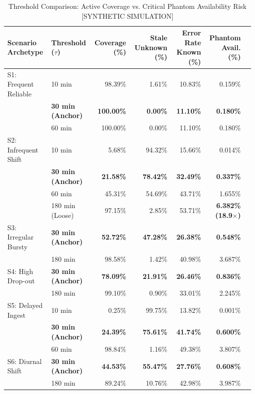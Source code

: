\documentclass[conference]{IEEEtran}
\begin{document}
\begin{table}[t]
\caption{Threshold Comparison: Active Coverage vs. Critical Phantom Availability Risk [SYNTHETIC SIMULATION]}
\label{tab:threshold_comparison}
\centering
\begin{tabular}{llrrrrr}
\toprule
Scenario Archetype & Threshold ($\tau$) & Coverage (\%) & Stale Unknown (\%) & Error Rate Known (\%) & Phantom Avail. (\%) \\
\midrule
S1: Frequent Reliable & 10 min & 98.39\% & 1.61\% & 10.83\% & 0.159\% \\
                      & \textbf{30 min (Anchor)} & \textbf{100.00\%} & \textbf{0.00\%} & \textbf{11.10\%} & \textbf{0.180\%} \\
                      & 60 min & 100.00\% & 0.00\% & 11.10\% & 0.180\% \\
\midrule
S2: Infrequent Shift  & 10 min & 5.68\% & 94.32\% & 15.66\% & 0.014\% \\
                      & \textbf{30 min (Anchor)} & \textbf{21.58\%} & \textbf{78.42\%} & \textbf{32.49\%} & \textbf{0.337\%} \\
                      & 60 min & 45.31\% & 54.69\% & 43.71\% & 1.655\% \\
                      & 180 min (Loose) & 97.15\% & 2.85\% & 53.71\% & \textbf{6.382\% (18.9$\times$)} \\
\midrule
S3: Irregular Bursty  & \textbf{30 min (Anchor)} & \textbf{52.72\%} & \textbf{47.28\%} & \textbf{26.38\%} & \textbf{0.548\%} \\
                      & 180 min & 98.58\% & 1.42\% & 40.98\% & 3.687\% \\
\midrule
S4: High Drop-out     & \textbf{30 min (Anchor)} & \textbf{78.09\%} & \textbf{21.91\%} & \textbf{26.46\%} & \textbf{0.836\%} \\
                      & 180 min & 99.10\% & 0.90\% & 33.01\% & 2.245\% \\
\midrule
S5: Delayed Ingest    & 10 min & 0.25\% & 99.75\% & 13.82\% & 0.001\% \\
                      & \textbf{30 min (Anchor)} & \textbf{24.39\%} & \textbf{75.61\%} & \textbf{41.74\%} & \textbf{0.600\%} \\
                      & 60 min & 98.84\% & 1.16\% & 49.38\% & 3.807\% \\
\midrule
S6: Diurnal Shift     & \textbf{30 min (Anchor)} & \textbf{44.53\%} & \textbf{55.47\%} & \textbf{27.76\%} & \textbf{0.608\%} \\
                      & 180 min & 89.24\% & 10.76\% & 42.98\% & 3.987\% \\
\bottomrule
\end{tabular}
\end{table}
\end{document}

